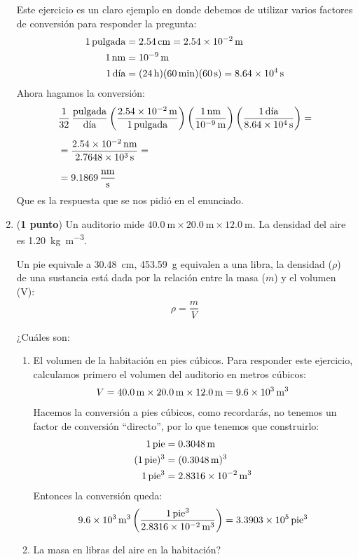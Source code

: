 \documentclass[14pt]{extarticle}
\begin{document}
\begin{enumerate}
Este ejercicio es un claro ejemplo en donde debemos de utilizar varios factores de conversión para responder la pregunta:
\begin{align*}
1 \, \text{pulgada} &= \SI{2.54}{\centi\meter} = \SI{2.54d-2}{\meter} \\
\SI{1}{\nano\meter} &= \SI{d-9}{\meter} \\
1 \, \text{día} &= (\SI{24}{\hour})({\SI{60}{\minute}})(\SI{60}{\second}) = \SI{8.64d4}{\second}
\end{align*}
Ahora hagamos la conversión:
\begin{align*}
&\dfrac{1}{32} \, \dfrac{\text{pulgada}}{\text{día}} \left( \dfrac{\SI{2.54d-2}{\meter}}{1 \, \text{pulgada}} \right) \left( \dfrac{\SI{1}{\nano\meter}}{\SI{d-9}{\meter}} \right) \left( \dfrac{1 \, \text{día}}{\SI{8.64d4}{\second}} \right) = \\[0.5em]
&= \dfrac{\SI{2.54d-2}{\nano\meter}}{\SI{2.7648d3}{\second}} = \\[0.5em]
&= \SI[per-mode=fraction]{9.1869}{\nano\meter\per\second}
\end{align*}
Que es la respuesta que se nos pidió en el enunciado.
\item (\textbf{1 punto}) Un auditorio mide $\SI{40.0}{\meter} \times \SI{20.0}{\meter} \times \SI{12.0}{\meter}$. La densidad del aire es \SI{1.20}{\kilo\gram\per\cubic\meter}.

Un pie equivale a \SI{30.48}{\centi\meter}, \SI{453.59}{\gram} equivalen a una libra, la densidad ($\rho$) de una sustancia está dada por la relación entre la masa ($m$) y el volumen (V):
\begin{align*}
\rho = \dfrac{m}{V}
\end{align*}

¿Cuáles son:
\begin{enumerate}
\item El volumen de la habitación en pies cúbicos.
Para responder este ejercicio, calculamos primero el volumen del auditorio en metros cúbicos:
\begin{align*}
V = \SI{40.0}{\meter} \times \SI{20.0}{\meter} \times \SI{12.0}{\meter} = \SI{9.6d3}{\cubic\meter}
\end{align*}
Hacemos la conversión a pies cúbicos, como recordarás, no tenemos un factor de conversión \enquote{directo}, por lo que tenemos que construirlo:
\begin{align*}
1 \, \text{pie} &= \SI{0.3048}{\meter} \\
(1 \, \text{pie})^{3} &= (\SI{0.3048}{\meter})^{3} \\
1 \, \text{pie}^{3} &= \SI{2.8316d-2}{\cubic\meter}
\end{align*}
Entonces la conversión queda:
\begin{align*}
\SI{9.6d3}{\cubic\meter} \left( \dfrac{1 \, \text{pie}^{3}}{\SI{2.8316d-2}{\cubic\meter}} \right) = \num{3.3903d5} \, \text{pie}^{3}
\end{align*}
\item La masa en libras del aire en la habitación?


\end{enumerate}
\end{enumerate}
\end{document}
